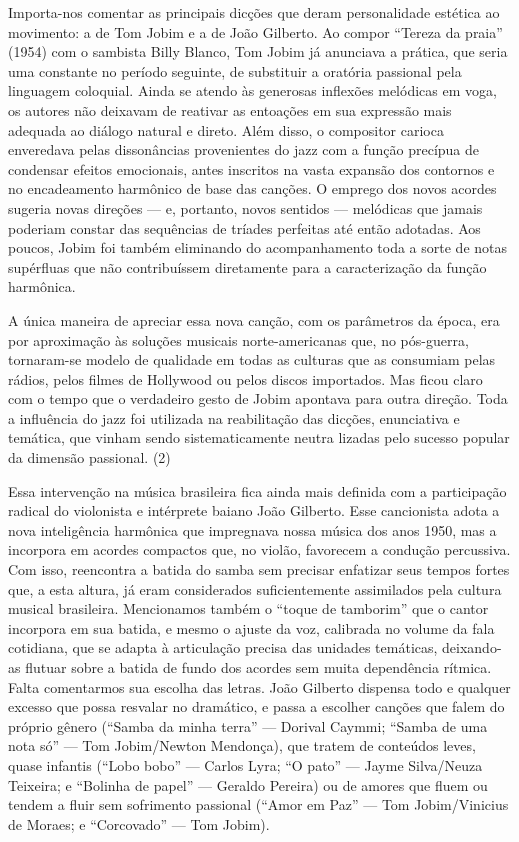 Importa-nos comentar as principais dicções que deram personalidade
estética ao movimento: a de Tom Jobim e a de João Gilberto. Ao compor
``Tereza da praia'' (1954) com o sambista Billy Blanco, Tom Jobim já
anunciava a prática, que seria uma constante no período seguinte, de
substituir a oratória passional pela linguagem coloquial. Ainda se
atendo às generosas inflexões melódicas em voga, os autores não deixavam
de reativar as entoações em sua expressão mais adequada ao diálogo
natural e direto. Além disso, o compositor carioca enveredava pelas
dissonâncias provenientes do jazz com a função precípua de condensar
efeitos emocionais, antes inscritos na vasta expansão dos contornos e no
encadeamento harmônico de base das canções. O emprego dos novos acordes
sugeria novas direções --- e, portanto, novos sentidos --- melódicas que
jamais poderiam constar das sequências de tríades perfeitas até então
adotadas. Aos poucos, Jobim foi também eliminando do acompanhamento toda
a sorte de notas supérfluas que não contribuíssem diretamente para a
caracterização da função harmônica.

A única maneira de apreciar essa nova canção, com os parâmetros da
época, era por aproximação às soluções musicais norte-americanas que, no
pós-guerra, tornaram-se modelo de qualidade em todas as culturas que as
consumiam pelas rádios, pelos filmes de Hollywood ou pelos discos
importados. Mas ficou claro com o tempo que o verdadeiro gesto de Jobim
apontava para outra direção. Toda a influência do jazz foi utilizada na
reabilitação das dicções, enunciativa e temática, que vinham sendo
sistematicamente neutra lizadas pelo sucesso popular da dimensão
passional. (2)

Essa intervenção na música brasileira fica ainda mais definida com a
participação radical do violonista e intérprete baiano João Gilberto.
Esse cancionista adota a nova inteligência harmônica que impregnava
nossa música dos anos 1950, mas a incorpora em acordes compactos que, no
violão, favorecem a condução percussiva. Com isso, reencontra a batida
do samba sem precisar enfatizar seus tempos fortes que, a esta altura,
já eram considerados suficientemente assimilados pela cultura musical
brasileira. Mencionamos também o ``toque de tamborim'' que o cantor
incorpora em sua batida, e mesmo o ajuste da voz, calibrada no volume da
fala cotidiana, que se adapta à articulação precisa das unidades
temáticas, deixando-as flutuar sobre a batida de fundo dos acordes sem
muita dependência rítmica. Falta comentarmos sua escolha das letras.
João Gilberto dispensa todo e qualquer excesso que possa resvalar no
dramático, e passa a escolher canções que falem do próprio gênero
(``Samba da minha terra'' --- Dorival Caymmi; ``Samba de uma nota só''
--- Tom Jobim/Newton Mendonça), que tratem de conteúdos leves, quase
infantis (``Lobo bobo'' --- Carlos Lyra; ``O pato'' --- Jayme
Silva/Neuza Teixeira; e ``Bolinha de papel'' --- Geraldo Pereira) ou de
amores que fluem ou tendem a fluir sem sofrimento passional (``Amor em
Paz'' --- Tom Jobim/Vinicius de Moraes; e ``Corcovado'' --- Tom Jobim).

